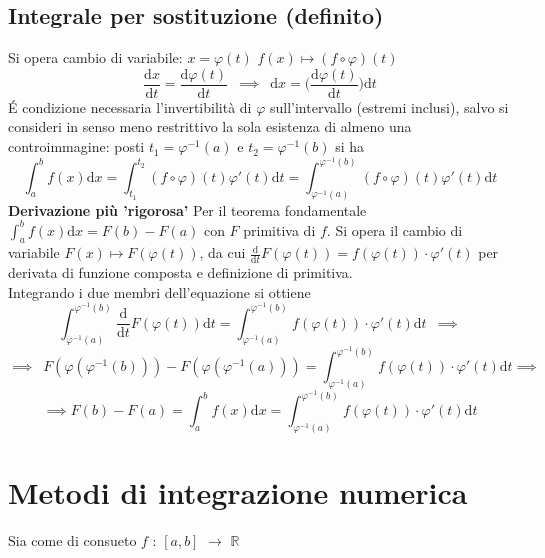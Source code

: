 \documentclass[10pt, oneside]{book}
\theoremstyle{plain}
\begin{document}
\subsection{Integrale per sostituzione (definito)}
Si opera cambio di variabile: $x = \varphi(t)$ $f(x) \longmapsto (f \circ \varphi)(t)$
\[\frac{\textrm{d}x}{\textrm{d}t} = \frac{\textrm{d}\varphi(t)}{\textrm{d}t} \enspace \implies \enspace \textrm{d}x = \big(\frac{\textrm{d}\varphi(t)}{\textrm{d}t}\big) \textrm{d}t\]
\'E condizione necessaria l'invertibilità di $\varphi$ sull'intervallo (estremi inclusi), salvo si consideri in senso meno restrittivo la sola esistenza di almeno una controimmagine: posti $t_1 = \varphi^{-1}(a)$ e $t_2 = \varphi^{-1}(b)$ si ha
\[\int_a^b f(x)\textrm{d}x = \int_{t_1}^{t_2} (f \circ \varphi)(t)\varphi'(t)\textrm{d}t = \int_{\varphi^{-1}(a)}^{\varphi^{-1}(b)} (f \circ \varphi)(t)\varphi'(t)\textrm{d}t\]
\textbf{Derivazione più 'rigorosa'} Per il teorema fondamentale $\int_a^b f(x)\textrm{d}x = F(b) - F(a)$ con $F$ primitiva di $f$. Si opera il cambio di variabile $F(x) \mapsto F(\varphi(t))$, da cui $\frac{\textrm{d}}{\textrm{d}t} F(\varphi(t)) = f(\varphi(t)) \cdot \varphi'(t)$ per derivata di funzione composta e definizione di primitiva.
\\Integrando i due membri dell'equazione si ottiene
\[\int_{\varphi^{-1}(a)}^{\varphi^{-1}(b)}\frac{\textrm{d}}{\textrm{d}t} F(\varphi(t)) \textrm{d}t = \int_{\varphi^{-1}(a)}^{\varphi^{-1}(b)}f(\varphi(t)) \cdot \varphi'(t)\textrm{d}t \enspace \implies\]
\[\implies \enspace F(\varphi(\varphi^{-1}(b))) - F(\varphi(\varphi^{-1}(a))) = \int_{\varphi^{-1}(a)}^{\varphi^{-1}(b)}f(\varphi(t)) \cdot \varphi'(t)\textrm{d}t \implies\]
\[\implies F(b) - F(a) = \int_a^b f(x)\textrm{d}x = \int_{\varphi^{-1}(a)}^{\varphi^{-1}(b)}f(\varphi(t)) \cdot \varphi'(t)\textrm{d}t\]

\section{Metodi di integrazione numerica}
Sia come di consueto $f$ : $[a,b]$ $\rightarrow$ $\mathbb{R}$
\end{document}
